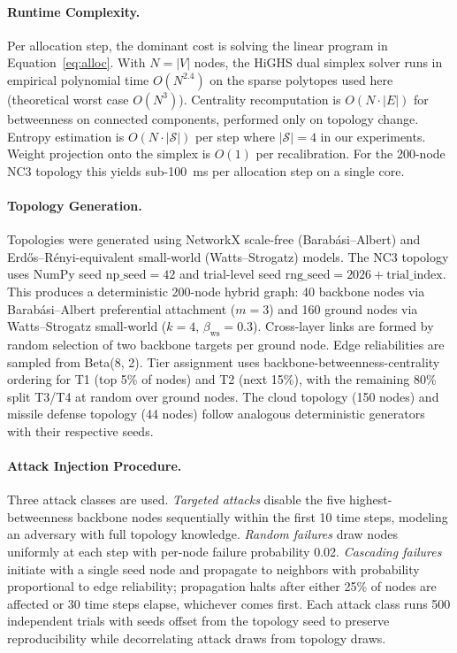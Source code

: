 \documentclass[runningheads]{llncs}
\begin{document}
\paragraph{Runtime Complexity.}
Per allocation step, the dominant cost is solving the linear program in Equation~\ref{eq:alloc}. With $N = |V|$ nodes, the HiGHS dual simplex solver runs in empirical polynomial time $O(N^{2.4})$ on the sparse polytopes used here (theoretical worst case $O(N^3)$). Centrality recomputation is $O(N \cdot |E|)$ for betweenness on connected components, performed only on topology change. Entropy estimation is $O(N \cdot |\mathcal{S}|)$ per step where $|\mathcal{S}| = 4$ in our experiments. Weight projection onto the simplex is $O(1)$ per recalibration. For the 200-node NC3 topology this yields sub-100~ms per allocation step on a single core.

\paragraph{Topology Generation.}
Topologies were generated using NetworkX scale-free (Barab\'{a}si--Albert) and Erd\H{o}s--R\'{e}nyi-equivalent small-world (Watts--Strogatz) models. The NC3 topology uses NumPy seed $\text{np\_seed} = 42$ and trial-level seed $\text{rng\_seed} = 2026 + \text{trial\_index}$. This produces a deterministic 200-node hybrid graph: 40 backbone nodes via Barab\'{a}si--Albert preferential attachment ($m = 3$) and 160 ground nodes via Watts--Strogatz small-world ($k = 4$, $\beta_{\text{ws}} = 0.3$). Cross-layer links are formed by random selection of two backbone targets per ground node. Edge reliabilities are sampled from Beta(8, 2). Tier assignment uses backbone-betweenness-centrality ordering for T1 (top 5\% of nodes) and T2 (next 15\%), with the remaining 80\% split T3/T4 at random over ground nodes. The cloud topology (150 nodes) and missile defense topology (44 nodes) follow analogous deterministic generators with their respective seeds.

\paragraph{Attack Injection Procedure.}
Three attack classes are used. \emph{Targeted attacks} disable the five highest-betweenness backbone nodes sequentially within the first 10 time steps, modeling an adversary with full topology knowledge. \emph{Random failures} draw nodes uniformly at each step with per-node failure probability 0.02. \emph{Cascading failures} initiate with a single seed node and propagate to neighbors with probability proportional to edge reliability; propagation halts after either 25\% of nodes are affected or 30 time steps elapse, whichever comes first. Each attack class runs 500 independent trials with seeds offset from the topology seed to preserve reproducibility while decorrelating attack draws from topology draws.
\end{document}
